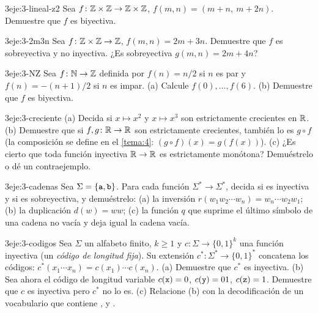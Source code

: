 \begin{ejercicio}{3}{eje:3-lineal-z2}
Sea $f\colon\mathbb{Z}\times\mathbb{Z}\to\mathbb{Z}\times\mathbb{Z}$, $f(m,n)=(m+n,\ m+2n)$. Demuestre que $f$ es biyectiva.
\end{ejercicio}

\begin{ejercicio}{3}{eje:3-2m3n}
Sea $f\colon\mathbb{Z}\times\mathbb{Z}\to\mathbb{Z}$, $f(m,n)=2m+3n$. Demuestre que $f$ es sobreyectiva y no inyectiva. ¿Es sobreyectiva $g(m,n)=2m+4n$?
\end{ejercicio}

\begin{ejercicio}{3}{eje:3-NZ}
Sea $f\colon\mathbb{N}\to\mathbb{Z}$ definida por $f(n)=n/2$ si $n$ es par y $f(n)=-(n+1)/2$ si $n$ es impar. (a) Calcule $f(0),\dots,f(6)$. (b) Demuestre que $f$ es biyectiva.
\end{ejercicio}

\begin{ejercicio}{3}{eje:3-creciente}
(a) Decida si $x\mapsto x^{2}$ y $x\mapsto x^{3}$ son estrictamente crecientes en $\mathbb{R}$. (b) Demuestre que si $f,g\colon\mathbb{R}\to\mathbb{R}$ son estrictamente crecientes, también lo es $g\circ f$ (la composición se define en el \cref{tema:4}: $(g\circ f)(x)=g(f(x))$). (c) ¿Es cierto que toda función inyectiva $\mathbb{R}\to\mathbb{R}$ es estrictamente monótona? Demuéstrelo o dé un contraejemplo.
\end{ejercicio}

\begin{ejercicio}{3}{eje:3-cadenas}
Sea $\Sigma=\{\texttt{a},\texttt{b}\}$. Para cada función $\Sigma^{*}\to\Sigma^{*}$, decida si es inyectiva y si es sobreyectiva, y demuéstrelo: (a) la inversión $r(w_1w_2\cdots w_n)=w_n\cdots w_2w_1$; (b) la duplicación $d(w)=ww$; (c) la función $q$ que suprime el último símbolo de una cadena no vacía y deja igual la cadena vacía.
\end{ejercicio}

\begin{ejercicio}{3}{eje:3-codigos}
Sea $\Sigma$ un alfabeto finito, $k\ge1$ y $c\colon\Sigma\to\{0,1\}^{k}$ una función inyectiva (un \emph{código de longitud fija}). Su extensión $c^{*}\colon\Sigma^{*}\to\{0,1\}^{*}$ concatena los códigos: $c^{*}(x_1\cdots x_n)=c(x_1)\cdots c(x_n)$. (a) Demuestre que $c^{*}$ es inyectiva. (b) Sea ahora el código de longitud variable $c(\texttt{x})=0$, $c(\texttt{y})=01$, $c(\texttt{z})=1$. Demuestre que $c$ es inyectiva pero $c^{*}$ no lo es. (c) Relacione (b) con la decodificación de un vocabulario que contiene ,  y .
\end{ejercicio}


